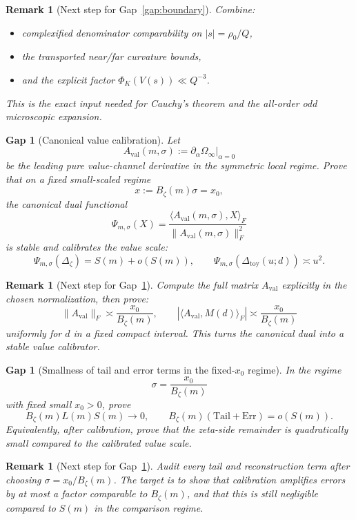 \documentclass[11pt]{article}
\newtheorem{remark}[theorem]{Remark}
\newtheorem{gap}[theorem]{Gap}
\newcommand{\PsiCal}{\Psi}
\newcommand{\val}{\mathrm{val}}
\newcommand{\toy}{\mathrm{toy}}
\newcommand{\zetaSide}{\zeta}
\newcommand{\Err}{\mathrm{Err}}
\newcommand{\Tail}{\mathrm{Tail}}
\begin{document}
\begin{remark}[Next step for Gap~\ref{gap:boundary}]
Combine:
\begin{itemize}[nosep]
\item complexified denominator comparability on $|s|=\rho_0/Q$,
\item the transported near/far curvature bounds,
\item and the explicit factor $\Phi_K(V(s))\ll Q^{-3}$.
\end{itemize}
This is the exact input needed for Cauchy's theorem and the all-order odd
microscopic expansion.
\end{remark}

\begin{gap}[Canonical value calibration]
\label{gap:value-calibration}
Let
\[
A_{\val}(m,\sigma):=\partial_\alpha \Omega_\infty\big|_{\alpha=0}
\]
be the leading pure value-channel derivative in the symmetric local regime.
Prove that on a fixed small-scaled regime
\[
x:=B_\zeta(m)\sigma=x_0,
\]
the canonical dual functional
\[
\PsiCal_{m,\sigma}(X)
=
\frac{\langle A_{\val}(m,\sigma),X\rangle_F}{\|A_{\val}(m,\sigma)\|_F^2}
\]
is stable and calibrates the value scale:
\[
\PsiCal_{m,\sigma}(\Delta_{\zetaSide})=S(m)+o(S(m)),
\qquad
\PsiCal_{m,\sigma}(\Delta_{\toy}(u;d))\asymp u^2.
\]
\end{gap}

\begin{remark}[Next step for Gap~\ref{gap:value-calibration}]
Compute the full matrix $A_{\val}$ explicitly in the chosen normalization, then
prove:
\[
\|A_{\val}\|_F \asymp \frac{x_0}{B_\zeta(m)},
\qquad
|\langle A_{\val},M(d)\rangle_F|
\asymp
\frac{x_0}{B_\zeta(m)}
\]
uniformly for $d$ in a fixed compact interval. This turns the canonical dual
into a stable value calibrator.
\end{remark}

\begin{gap}[Smallness of tail and error terms in the fixed-$x_0$ regime]
\label{gap:smallness-regime}
In the regime
\[
\sigma=\frac{x_0}{B_\zeta(m)}
\]
with fixed small $x_0>0$, prove
\[
B_\zeta(m)L(m)S(m)\to 0,
\qquad
B_\zeta(m)(\Tail+\Err)=o(S(m)).
\]
Equivalently, after calibration, prove that the zeta-side remainder is
quadratically small compared to the calibrated value scale.
\end{gap}

\begin{remark}[Next step for Gap~\ref{gap:smallness-regime}]
Audit every tail and reconstruction term after choosing $\sigma=x_0/B_\zeta(m)$.
The target is to show that calibration amplifies errors by at most a factor
comparable to $B_\zeta(m)$, and that this is still negligible compared to
$S(m)$ in the comparison regime.
\end{remark}
\end{document}
